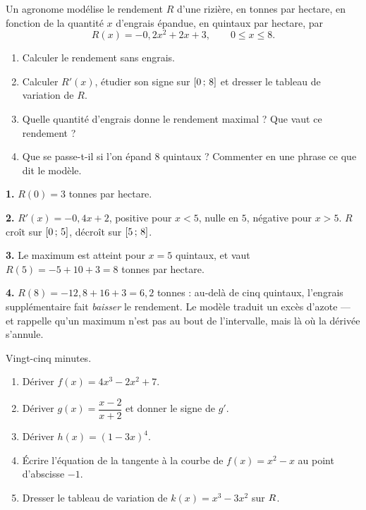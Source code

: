 \begin{situation}
Un agronome modélise le rendement $R$ d'une rizière, en tonnes par hectare,
en fonction de la quantité $x$ d'engrais épandue, en quintaux par hectare,
par
\[
  R(x) = -0{,}2x^{2}+2x+3, \qquad 0 \leq x \leq 8 .
\]

\begin{enumerate}[label=\textbf{\arabic*.}, leftmargin=*, itemsep=0.3em]
  \item Calculer le rendement sans engrais.
  \item Calculer $R'(x)$, étudier son signe sur $\left[0\,;\,8\right]$ et
        dresser le tableau de variation de $R$.
  \item Quelle quantité d'engrais donne le rendement maximal ? Que vaut ce
        rendement ?
  \item Que se passe-t-il si l'on épand $8$ quintaux ? Commenter en une
        phrase ce que dit le modèle.
\end{enumerate}
\end{situation}

\begin{corrige}
\textbf{1.} $R(0) = 3$ tonnes par hectare.

\textbf{2.} $R'(x) = -0{,}4x+2$, positive pour $x < 5$, nulle en $5$,
négative pour $x > 5$. $R$ croît sur $\left[0\,;\,5\right]$, décroît sur
$\left[5\,;\,8\right]$.

\textbf{3.} Le maximum est atteint pour $x = 5$ quintaux, et vaut
$R(5) = -5+10+3 = 8$ tonnes par hectare.

\textbf{4.} $R(8) = -12{,}8+16+3 = 6{,}2$ tonnes : au-delà de cinq quintaux,
l'engrais supplémentaire fait \emph{baisser} le rendement. Le modèle traduit
un excès d'azote — et rappelle qu'un maximum n'est pas au bout de
l'intervalle, mais là où la dérivée s'annule.
\end{corrige}

\begin{jemeteste}
Vingt-cinq minutes.

\begin{enumerate}[label=\textbf{\arabic*.}, leftmargin=*, itemsep=0.3em]
  \item Dériver $f(x) = 4x^{3}-2x^{2}+7$.
  \item Dériver $g(x) = \dfrac{x-2}{x+2}$ et donner le signe de $g'$.
  \item Dériver $h(x) = (1-3x)^{4}$.
  \item Écrire l'équation de la tangente à la courbe de
        $f(x) = x^{2}-x$ au point d'abscisse $-1$.
  \item Dresser le tableau de variation de $k(x) = x^{3}-3x^{2}$ sur $R$.
\end{enumerate}
\end{jemeteste}

